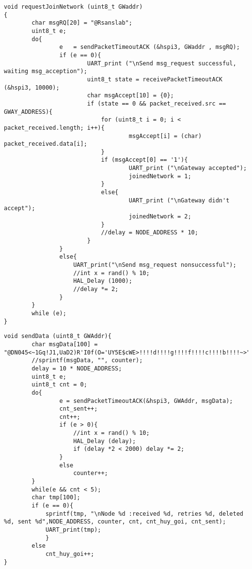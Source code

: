 \newpage
\begin{center}
\end{center}
\begin{lstlisting}
void requestJoinNetwork (uint8_t GWaddr)
{
		char msgRQ[20] = "@Rsanslab";
		uint8_t e;
		do{
				e	= sendPacketTimeoutACK (&hspi3, GWaddr , msgRQ);
				if (e == 0){
						UART_print ("\nSend msg_request successful, waiting msg_acception");
						uint8_t state = receivePacketTimeoutACK (&hspi3, 10000);
						char msgAccept[10] = {0};
						if (state == 0 && packet_received.src == GWAY_ADDRESS){
							for (uint8_t i = 0; i < packet_received.length; i++){
									msgAccept[i] = (char) packet_received.data[i];
							}
							if (msgAccept[0] == '1'){
									UART_print ("\nGateway accepted");
									joinedNetwork = 1;
							}
							else{
									UART_print ("\nGateway didn't accept");
									joinedNetwork = 2;
							}
							//delay = NODE_ADDRESS * 10;
						}
				}
				else{
					UART_print("\nSend msg_request nonsuccessful");
					//int x = rand() % 10;
					HAL_Delay (1000);
					//delay *= 2;
				}
		}
		while (e);
}
\end{lstlisting}
\newpage
\begin{center}
\end{center}
\begin{lstlisting}
void sendData (uint8_t GWAddr){
		char msgData[100] = "@DN045<~1Gq!J1,UaD2)R'I0f(O='UY5E$cWE>!!!!d!!!!g!!!!f!!!!c!!!!b!!!!~>";
		//sprintf(msgData, "", counter);
		delay = 10 * NODE_ADDRESS;
		uint8_t e;
		uint8_t cnt = 0;
		do{
				e = sendPacketTimeoutACK(&hspi3, GWAddr, msgData);
				cnt_sent++;
				cnt++;
				if (e > 0){
					//int x = rand() % 10;
					HAL_Delay (delay);
					if (delay *2 < 2000) delay *= 2;
				}
				else
					counter++;
		}
		while(e && cnt < 5);
		char tmp[100];
		if (e == 0){
			sprintf(tmp, "\nNode %d :received %d, retries %d, deleted %d, sent %d",NODE_ADDRESS, counter, cnt, cnt_huy_goi, cnt_sent);
			UART_print(tmp);
			}
		else 
			cnt_huy_goi++;
}
\end{lstlisting}